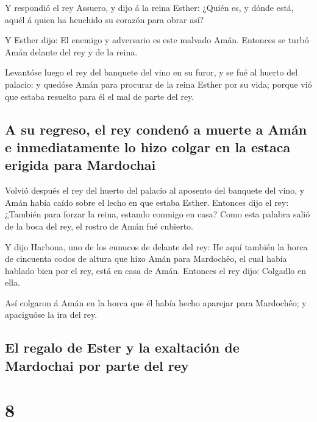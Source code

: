  Y respondió el rey Assuero, y dijo á la reina Esther:
¿Quién es, y dónde está, aquél á quien ha henchido su corazón para obrar
así?

 Y Esther dijo: El enemigo y adversario es este malvado
Amán. Entonces se turbó Amán delante del rey y de la reina.

 Levantóse luego el rey del banquete del vino en su furor,
y se fué al huerto del palacio: y quedóse Amán para procurar de la reina
Esther por su vida; porque vió que estaba resuelto para él el mal de
parte del rey.

\hypertarget{a-su-regreso-el-rey-condenuxf3-a-muerte-a-amuxe1n-e-inmediatamente-lo-hizo-colgar-en-la-estaca-erigida-para-mardochai}{%
\subsection{A su regreso, el rey condenó a muerte a Amán e
inmediatamente lo hizo colgar en la estaca erigida para
Mardochai}\label{a-su-regreso-el-rey-condenuxf3-a-muerte-a-amuxe1n-e-inmediatamente-lo-hizo-colgar-en-la-estaca-erigida-para-mardochai}}

 Volvió después el rey del huerto del palacio al aposento
del banquete del vino, y Amán había caído sobre el lecho en que estaba
Esther. Entonces dijo el rey: ¿También para forzar la reina, estando
conmigo en casa? Como esta palabra salió de la boca del rey, el rostro
de Amán fué cubierto.

 Y dijo Harbona, uno de los eunucos de delante del rey: He
aquí también la horca de cincuenta codos de altura que hizo Amán para
Mardochêo, el cual había hablado bien por el rey, está en casa de Amán.
Entonces el rey dijo: Colgadlo en ella.

 Así colgaron á Amán en la horca que él había hecho
aparejar para Mardochêo; y apaciguóse la ira del rey.

\hypertarget{el-regalo-de-ester-y-la-exaltaciuxf3n-de-mardochai-por-parte-del-rey}{%
\subsection{El regalo de Ester y la exaltación de Mardochai por parte
del
rey}\label{el-regalo-de-ester-y-la-exaltaciuxf3n-de-mardochai-por-parte-del-rey}}

\hypertarget{section-7}{%
\section{8}\label{section-7}}


